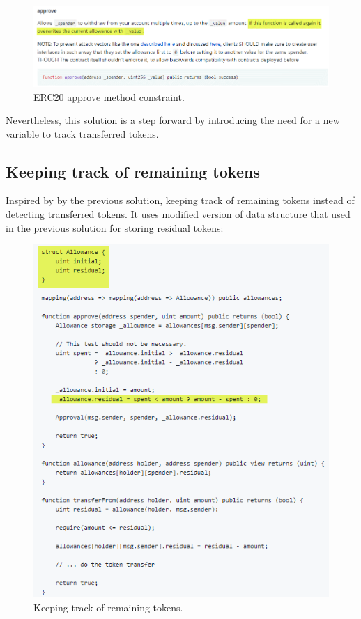 \begin{figure}[H]
	\centering
	\includegraphics[width=1.0\linewidth]{figures/multiple_withdrawal_28.png}
	\caption{ERC20 approve method constraint.}
\end{figure}
\noindent Nevertheless, this solution is a step forward by introducing the need for a new variable to track transferred tokens.

\subsection{Keeping track of remaining tokens}
Inspired by by the previous solution, \cite{Ref18} keeping track of remaining tokens instead of detecting transferred tokens. It uses modified version of data structure that used in the previous solution for storing residual tokens:
\begin{figure}[H]
	\centering
	\includegraphics[width=1.0\linewidth]{figures/multiple_withdrawal_29.png}
	\caption{Keeping track of remaining tokens.}
\end{figure}
